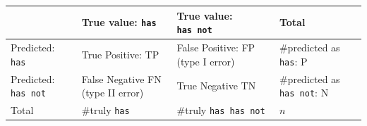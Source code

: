 \documentclass[12pt,]{krantz}
\begin{document}
\begin{longtable}[]{@{}llll@{}}
\toprule
\begin{minipage}[b]{0.17\columnwidth}\raggedright
\strut
\end{minipage} & \begin{minipage}[b]{0.26\columnwidth}\raggedright
True value: \texttt{has}\strut
\end{minipage} & \begin{minipage}[b]{0.26\columnwidth}\raggedright
True value: \texttt{has\ not}\strut
\end{minipage} & \begin{minipage}[b]{0.20\columnwidth}\raggedright
Total\strut
\end{minipage}\tabularnewline
\midrule
\endhead
\begin{minipage}[t]{0.17\columnwidth}\raggedright
Predicted: \texttt{has}\strut
\end{minipage} & \begin{minipage}[t]{0.26\columnwidth}\raggedright
True Positive: TP\strut
\end{minipage} & \begin{minipage}[t]{0.26\columnwidth}\raggedright
False Positive: FP (type I error)\strut
\end{minipage} & \begin{minipage}[t]{0.20\columnwidth}\raggedright
\#predicted as \texttt{has}: P\strut
\end{minipage}\tabularnewline
\begin{minipage}[t]{0.17\columnwidth}\raggedright
Predicted: \texttt{has\ not}\strut
\end{minipage} & \begin{minipage}[t]{0.26\columnwidth}\raggedright
False Negative FN (type II error)\strut
\end{minipage} & \begin{minipage}[t]{0.26\columnwidth}\raggedright
True Negative TN\strut
\end{minipage} & \begin{minipage}[t]{0.20\columnwidth}\raggedright
\#predicted as \texttt{has\ not}: N\strut
\end{minipage}\tabularnewline
\begin{minipage}[t]{0.17\columnwidth}\raggedright
Total\strut
\end{minipage} & \begin{minipage}[t]{0.26\columnwidth}\raggedright
\#truly \texttt{has}\strut
\end{minipage} & \begin{minipage}[t]{0.26\columnwidth}\raggedright
\#truly \texttt{has\ has\ not}\strut
\end{minipage} & \begin{minipage}[t]{0.20\columnwidth}\raggedright
\(n\)\strut
\end{minipage}\tabularnewline
\bottomrule
\end{longtable}
\end{document}
